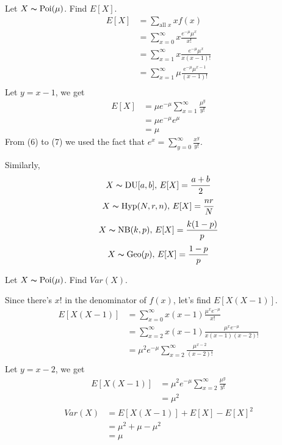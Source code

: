 Let $ X \thicksim \operatorname{Poi}(\mu) $. Find $ E[X] $.
\setcounter{equation}{0}
\begin{align}
    E[X]&=\sum\limits_{\text{all } x}x f(x)\\
    &=\sum\limits_{x=0}^{\infty} x \frac{e^{-\mu}\mu^x}{x!}\\
    &=\sum\limits_{x=1}^{\infty} x \frac{e^{-\mu}\mu^x}{x(x-1)!}\\
    &=\sum\limits_{x=1}^{\infty} \mu \frac{e^{-\mu}\mu^{x-1}}{(x-1)!}\\
\end{align}
Let $ y=x-1 $, we get
\begin{align}
    E[X]&=\mu e^{-\mu}\sum\limits_{x=1}^{\infty} \frac{\mu^{y}}{y!}\\
    &=\mu e^{-\mu}e^\mu\\
    &=\mu
\end{align}
From (6) to (7) we used the fact that $ e^x=\sum\limits_{y=0}^{\infty}\frac{x^y}{y!} $.

Similarly,
\[ X \thicksim \operatorname{DU}[a,b],\, E[X]=\frac{a+b}{2} \]
\[ X \thicksim \operatorname{Hyp}(N,r,n),\, E[X]=\frac{nr}{N} \]
\[ X \thicksim \operatorname{NB}(k,p),\,E[X]=\frac{k(1-p)}{p} \]
\[ X \thicksim \operatorname{Geo}(p),\,E[X]=\frac{1-p}{p} \]

Let $ X \thicksim \operatorname{Poi}(\mu) $. Find $ Var(X) $.

Since there's $ x! $ in the denominator of $ f(x) $, let's find
$ E[X(X-1)] $.
\begin{align*}
    E[X(X-1)]&=\sum\limits_{x=0}^{\infty}x(x-1)\frac{\mu^xe^{-\mu}}{x!}\\
    &=\sum\limits_{x=2}^{\infty}x(x-1)\frac{\mu^xe^{-\mu}}{x(x-1)(x-2)!}\\
    &=\mu^2e^{-\mu}\sum\limits_{x=2}^{\infty} \frac{\mu^{x-2}}{(x-2)!}\\
\end{align*}
Let $ y=x-2 $, we get
\begin{align*}
    E[X(X-1)]&=\mu^2e^{-\mu}\sum\limits_{x=2}^{\infty} \frac{\mu^{y}}{y!}\\
    &=\mu^2
\end{align*}
\begin{align*}
    Var(X)&=E[X(X-1)]+E[X]-E[X]^2\\
    &=\mu^2+\mu-\mu^2\\
    &=\mu
\end{align*}

